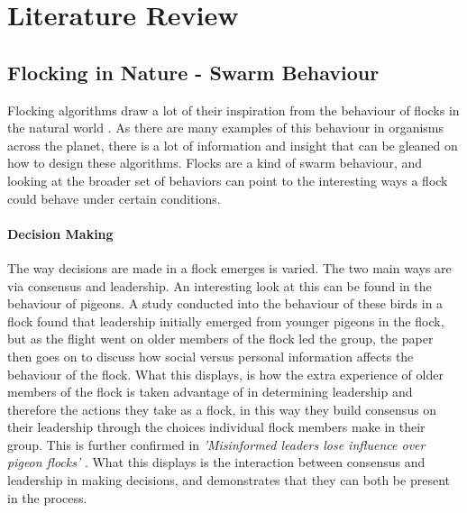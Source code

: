 


\section{Literature Review}

\subsection{Flocking in Nature - Swarm Behaviour}
Flocking algorithms draw a lot of their inspiration from the behaviour of flocks in the natural world \citep{flake1998computational}. As there are many examples of this behaviour in organisms across the planet, there is a lot of information and insight that can be gleaned on how to design these algorithms. Flocks are a kind of swarm behaviour, and looking at the broader set of behaviors can point to the interesting ways a flock could behave under certain conditions.

	\paragraph{Decision Making}
	The way decisions are made in a flock emerges is varied. The two main ways are via consensus and leadership. An interesting look at this can be found in the behaviour of pigeons. A study conducted into the behaviour of these birds in a flock \citep{Jorge2414} found that leadership initially emerged from younger pigeons in the flock, but as the flight went on older members of the flock led the group, the paper then goes on to discuss how social versus personal information affects the behaviour of the flock. What this displays, is how the extra experience of older members of the flock is taken advantage of in determining leadership and therefore the actions they take as a flock, in this way they build consensus on their leadership through the choices individual flock members make in their group. This is further confirmed in \textit{ 'Misinformed leaders lose influence over pigeon flocks' }\citet{doi:10.1098/rsbl.2016.0544}. What this displays is the interaction between consensus and leadership in making decisions, and demonstrates that they can both be present in the process.
	
